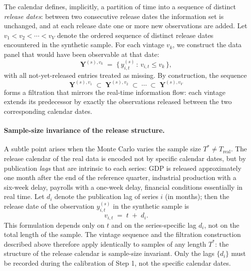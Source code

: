 \documentclass[11pt, a4paper, oneside]{article}
\begin{document}
The calendar defines, implicitly, a partition of time into a
sequence of distinct \emph{release dates}: between two consecutive
release dates the information set is unchanged, and at each
release date one or more new observations are added. Let
$v_1 < v_2 < \cdots < v_V$ denote the ordered sequence of distinct
release dates encountered in the synthetic sample. For each
vintage $v_k$, we construct the data panel that would have been
observable at that date:
\[
\mathbf{Y}^{(s), v_k} \;=\;
\big\{\, y_{i, t}^{(s)} \,:\, v_{i, t} \leq v_k \,\big\},
\]
with all not-yet-released entries treated as missing. By
construction, the sequence
\[
\mathbf{Y}^{(s), v_1} \;\subset\; \mathbf{Y}^{(s), v_2} \;\subset\; \cdots \;\subset\; \mathbf{Y}^{(s), v_V}
\]
forms a filtration that mirrors the real-time information flow:
each vintage extends its predecessor by exactly the observations
released between the two corresponding calendar dates.

\paragraph{Sample-size invariance of the release structure.}
A subtle point arises when the Monte Carlo varies the sample size
$T^* \neq T_{\mathrm{real}}$. The release calendar of the real
data is encoded not by specific calendar dates, but by
publication \emph{lags} that are intrinsic to each series: GDP is
released approximately one month after the end of the reference
quarter, industrial production with a six-week delay, payrolls
with a one-week delay, financial conditions essentially in real
time. Let $d_i$ denote the publication lag of series $i$
(in months); then the release date of the observation
$y_{i, t}^{(s)}$ in the synthetic sample is
\[
v_{i, t} \;=\; t \;+\; d_i.
\]
This formulation depends only on $t$ and on the series-specific
lag $d_i$, not on the total length of the sample. The vintage
sequence and the filtration construction described above therefore
apply identically to samples of any length $T^*$: the structure
of the release calendar is sample-size invariant. Only the lags
$\{d_i\}$ must be recorded during the calibration of Step 1, not
the specific calendar dates.
\end{document}
